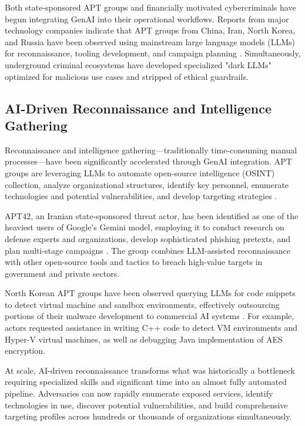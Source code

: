 Both state-sponsored APT groups and financially motivated cybercriminals have begun integrating GenAI into their operational workflows. Reports from major technology companies indicate that APT groups from China, Iran, North Korea, and Russia have been observed using mainstream large language models (LLMs) for reconnaissance, tooling development, and campaign planning \cite{google2025}. Simultaneously, underground criminal ecosystems have developed specialized "dark LLMs" optimized for malicious use cases and stripped of ethical guardrails.

\subsection{AI-Driven Reconnaissance and Intelligence Gathering}

Reconnaissance and intelligence gathering—traditionally time-consuming manual processes—have been significantly accelerated through GenAI integration. APT groups are leveraging LLMs to automate open-source intelligence (OSINT) collection, analyze organizational structures, identify key personnel, enumerate technologies and potential vulnerabilities, and develop targeting strategies \cite{deepinstinct2025}.

APT42, an Iranian state-sponsored threat actor, has been identified as one of the heaviest users of Google's Gemini model, employing it to conduct research on defense experts and organizations, develop sophisticated phishing pretexts, and plan multi-stage campaigns \cite{deepinstinct2025}. The group combines LLM-assisted reconnaissance with other open-source tools and tactics to breach high-value targets in government and private sectors.

North Korean APT groups have been observed querying LLMs for code snippets to detect virtual machine and sandbox environments, effectively outsourcing portions of their malware development to commercial AI systems \cite{google2025}. For example, actors requested assistance in writing C++ code to detect VM environments and Hyper-V virtual machines, as well as debugging Java implementation of AES encryption.

At scale, AI-driven reconnaissance transforms what was historically a bottleneck requiring specialized skills and significant time into an almost fully automated pipeline. Adversaries can now rapidly enumerate exposed services, identify technologies in use, discover potential vulnerabilities, and build comprehensive targeting profiles across hundreds or thousands of organizations simultaneously.

